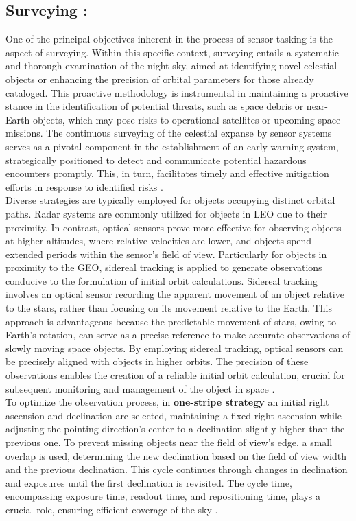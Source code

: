\subsection{Surveying :}

One of the principal objectives inherent in the process of sensor tasking is the aspect of surveying. Within this specific context, surveying entails a systematic and thorough examination of the night sky, aimed at identifying novel celestial objects or enhancing the precision of orbital parameters for those already cataloged. This proactive methodology is instrumental in maintaining a proactive stance in the identification of potential threats, such as space debris or near-Earth objects, which may pose risks to operational satellites or upcoming space missions. The continuous surveying of the celestial expanse by sensor systems serves as a pivotal component in the establishment of an early warning system, strategically positioned to detect and communicate potential hazardous encounters promptly. This, in turn, facilitates timely and effective mitigation efforts in response to identified risks \cite{survey}.\\
 
Diverse strategies are typically employed for objects occupying distinct orbital paths. Radar systems are commonly utilized for objects in LEO due to their proximity. In contrast, optical sensors prove more effective for observing objects at higher altitudes, where relative velocities are lower, and objects spend extended periods within the sensor's field of view. Particularly for objects in proximity to the GEO, sidereal tracking is applied to generate observations conducive to the formulation of initial orbit calculations. Sidereal tracking involves an optical sensor recording the apparent movement of an object relative to the stars, rather than focusing on its movement relative to the Earth. This approach is advantageous because the predictable movement of stars, owing to Earth's rotation, can serve as a precise reference to make accurate observations of slowly moving space objects. By employing sidereal tracking, optical sensors can be precisely aligned with objects in higher orbits. The precision of these observations enables the creation of a reliable initial orbit calculation, crucial for subsequent monitoring and management of the object in space \cite{survey}.\\

To optimize the observation process, in \textbf{one-stripe strategy} an initial right ascension and declination are selected, maintaining a fixed right ascension while adjusting the pointing direction's center to a declination slightly higher than the previous one. To prevent missing objects near the field of view's edge, a small overlap is used, determining the new declination based on the field of view width and the previous declination. This cycle continues through changes in declination and exposures until the first declination is revisited. The cycle time, encompassing exposure time, readout time, and repositioning time, plays a crucial role, ensuring efficient coverage of the sky \cite{fruh1}.\\

